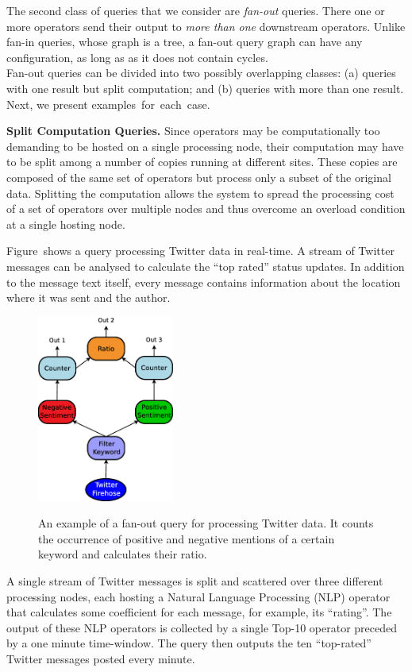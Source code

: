 The second class of queries that we consider are \textit{fan-out} queries. There one or more operators
send their output to \textit{more than one} downstream operators.
Unlike fan-in queries, whose graph is a tree, a fan-out query
graph can have any configuration, as long as as it does not contain cycles.\\
Fan-out queries can be divided into two possibly overlapping classes: (a) queries with one
result but split computation; and (b) queries with more than one result. Next, we present
examples~for~each~case.

\textbf{Split Computation Queries.} 
Since operators may be computationally too demanding to be hosted on a single processing node, their
computation may have to be split among a number of copies running at different sites. These
copies are composed of the same set of operators but process only a subset of the original data.
Splitting the computation allows the system to spread the processing cost of a set of operators over
multiple nodes and thus overcome an overload condition at a single hosting node. 

\ex Figure~\DIFdelbegin \DIFdel{\ref{fig:query_fanout} }\DIFdelend \DIFaddbegin \DIFadd{\ref{fig:fanout_mr2} }\DIFaddend shows a query processing Twitter data in
real-time. A stream of Twitter messages can be analysed to calculate the ``top rated'' status updates.
In addition to the message text itself, every message contains information about the location where it
was sent and the author.
\DIFdelbegin %
\DIFdelendFL \DIFaddbeginFL \begin{figure}[t]
	\DIFaddendFL \centering
	\includegraphics[width=0.4\textwidth]{img/tesi/fan-out_2_senza} 
	\caption{An example of a fan-out query for processing Twitter data. It counts the occurrence of positive
	and negative mentions of a certain keyword and calculates their ratio.}
	\DIFdelbeginFL %
\DIFdelendFL \DIFaddbeginFL \label{fig:query_fanouts3}
\DIFaddendFL \end{figure}
A single stream of Twitter messages is split and scattered over three different processing nodes, each
hosting a Natural Language Processing (NLP) operator that calculates some coefficient for each message,
for example, its ``rating''. The output of these NLP operators is collected by a single Top-10
operator preceded by a one minute time-window. The query then outputs the ten ``top-rated'' Twitter
messages posted every minute. 

